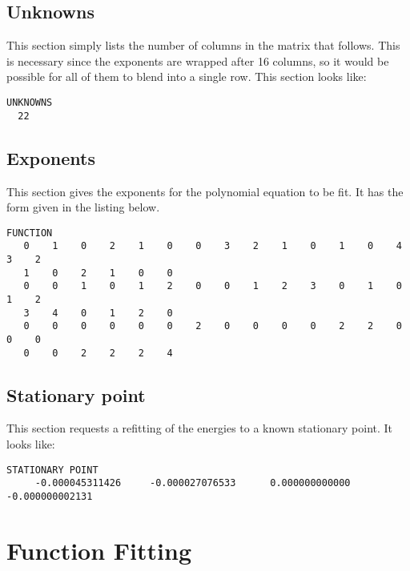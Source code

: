 \documentclass{article}
\begin{document}
\subsection{Unknowns}

This section simply lists the number of columns in the matrix that follows. This
is necessary since the exponents are wrapped after 16 columns, so it would be
possible for all of them to blend into a single row. This section looks like:

\begin{lstlisting}
UNKNOWNS
  22
\end{lstlisting}

\subsection{Exponents}

This section gives the exponents for the polynomial equation to be fit. It has
the form given in the listing below.

\begin{lstlisting}
FUNCTION
   0    1    0    2    1    0    0    3    2    1    0    1    0    4    3    2
   1    0    2    1    0    0
   0    0    1    0    1    2    0    0    1    2    3    0    1    0    1    2
   3    4    0    1    2    0
   0    0    0    0    0    0    2    0    0    0    0    2    2    0    0    0
   0    0    2    2    2    4
\end{lstlisting}

\subsection{Stationary point}

This section requests a refitting of the energies to a known stationary point.
It looks like:

\begin{lstlisting}
STATIONARY POINT
     -0.000045311426     -0.000027076533      0.000000000000     -0.000000002131
\end{lstlisting}


\section{Function Fitting}
\end{document}

